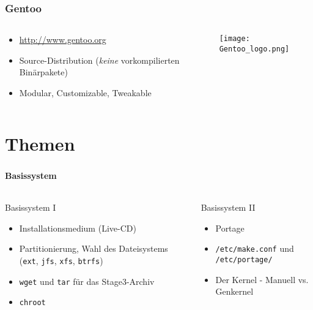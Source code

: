 \documentclass[utf8]{beamer}
\begin{document}
\begin{frame}
  \frametitle{Gentoo}

  \begin{columns}
      \begin{block}{}
        \begin{itemize}
          \item \url{http://www.gentoo.org}
          \item Source-Distribution (\textit{keine} vorkompilierten Binärpakete)
          \item Modular, Customizable, Tweakable
        \end{itemize}
      \end{block}
      \hfill
      \texttt{[image: Gentoo\_logo.png]}
  \end{columns}
\end{frame}

\section{Themen}

\begin{frame}
  \frametitle{\insertsectionhead}
  \framesubtitle{Basissystem}

\begin{columns}
\begin{block}{Basissystem I}
  \begin{itemize}
    \item Installationsmedium (Live-CD)
    \item Partitionierung, Wahl des Dateisystems (\texttt{ext}, \texttt{jfs}, \texttt{xfs}, \texttt{btrfs})
    \item \texttt{wget} und \texttt{tar} für das Stage3-Archiv
    \item \texttt{chroot}
  \end{itemize}
\end{block}

\begin{block}{Basissystem II}
  \begin{itemize}
    \item Portage
    \item \texttt{/etc/make.conf} und \texttt{/etc/portage/}
    \item Der Kernel - Manuell vs. Genkernel
    \vspace{3\baselineskip}
  \end{itemize}
\end{block}
\end{columns}
\end{frame}
\end{document}
